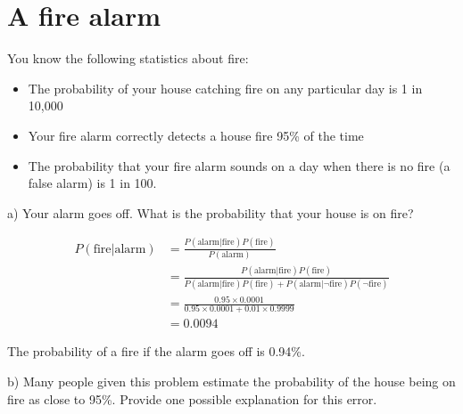 \documentclass[
  letterpaper,
  DIV=11,
  numbers=noendperiod]{scrreprt}
\begin{document}
\hypertarget{a-fire-alarm}{%
\section{A fire alarm}\label{a-fire-alarm}}

You know the following statistics about fire:

\begin{itemize}
\item
  The probability of your house catching fire on any particular day is 1
  in 10,000
\item
  Your fire alarm correctly detects a house fire 95\% of the time
\item
  The probability that your fire alarm sounds on a day when there is no
  fire (a false alarm) is 1 in 100.
\end{itemize}

a) Your alarm goes off. What is the probability that your house is on
fire?

\begin{tcolorbox}[enhanced jigsaw, title=\textcolor{quarto-callout-tip-color}{\faLightbulb}\hspace{0.5em}{Answer}, toprule=.15mm, colback=white, breakable, titlerule=0mm, colframe=quarto-callout-tip-color-frame, coltitle=black, opacityback=0, rightrule=.15mm, colbacktitle=quarto-callout-tip-color!10!white, bottomtitle=1mm, opacitybacktitle=0.6, arc=.35mm, bottomrule=.15mm, toptitle=1mm, leftrule=.75mm, left=2mm]

\begin{align*}
P(\text{fire}|\text{alarm})&=\frac{P(\text{alarm}|\text{fire})P(\text{fire})}{P(\text{alarm})} \\[6pt]
&=\frac{P(\text{alarm}|\text{fire})P(\text{fire})}{P(\text{alarm}|\text{fire})P(\text{fire})+P(\text{alarm}|\neg\text{fire})P(\neg\text{fire})} \\[6pt]
&=\frac{0.95\times 0.0001}{0.95\times 0.0001+0.01\times 0.9999} \\[6pt]
&=0.0094
\end{align*}

The probability of a fire if the alarm goes off is 0.94\%.

\end{tcolorbox}

b) Many people given this problem estimate the probability of the house
being on fire as close to 95\%. Provide one possible explanation for
this error.
\end{document}

